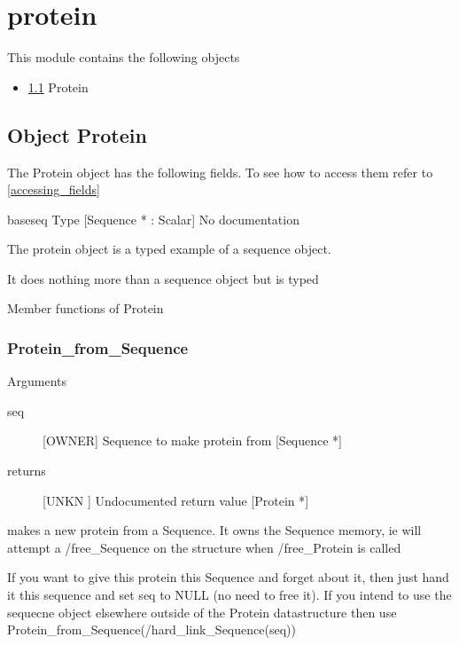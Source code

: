\section{protein}
\label{module_protein}
This module contains the following objects

\begin{itemize}
\item \ref{object_Protein} Protein

\end{itemize}
\subsection{Object Protein}

\label{object_Protein}

The Protein object has the following fields. To see how to access them refer to \ref{accessing_fields}
\begin{description}
\item{baseseq} Type [Sequence * : Scalar] No documentation

\end{description}
The protein object is a typed
example of a sequence object.


It does nothing more than a sequence
object but is typed




Member functions of Protein

\subsubsection{Protein_from_Sequence}

Arguments
\begin{description}
\item[seq] [OWNER] Sequence to make protein from [Sequence *]
\item[returns] [UNKN ] Undocumented return value [Protein *]
\end{description}
makes a new protein from a Sequence. It 
owns the Sequence memory, ie will attempt a /free_Sequence
on the structure when /free_Protein is called


If you want to give this protein this Sequence and
forget about it, then just hand it this sequence and set
seq to NULL (no need to free it). If you intend to use 
the sequecne object elsewhere outside of the Protein datastructure
then use Protein_from_Sequence(/hard_link_Sequence(seq))




